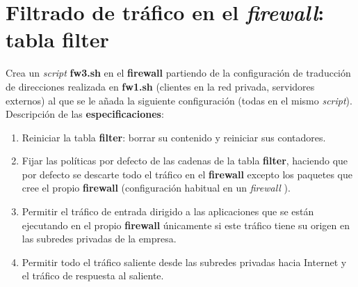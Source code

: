 \documentclass[12pt, a4paper]{report}
\begin{document}
\chapter{Filtrado de tráfico en el \textit{firewall}: tabla filter}
Crea un \textit{script} \textbf{fw3.sh} en el \textbf{firewall} partiendo de la configuración de traducción de direcciones
realizada en \textbf{fw1.sh} (clientes en la red privada, servidores externos) al que se le añada la siguiente
configuración (todas en el mismo \textit{script}). Descripción de las \textbf{especificaciones}:
\begin{enumerate}
	\item Reiniciar la tabla \textbf{filter}: borrar su contenido y reiniciar sus contadores.
	\item Fijar las políticas por defecto de las cadenas de la tabla \textbf{filter}, haciendo que por defecto se
	descarte todo el tráfico en el \textbf{firewall} excepto los paquetes que cree el propio \textbf{firewall} (configuración habitual en un \textit{firewall} ).
	\item Permitir el tráfico de entrada dirigido a las aplicaciones que se están ejecutando en el propio
	\textbf{firewall} únicamente si este tráfico tiene su origen en las subredes privadas de la empresa.
	\item Permitir todo el tráfico saliente desde las subredes privadas hacia Internet y el tráfico de respuesta
	al saliente.\\
	

\end{enumerate}
\end{document}
